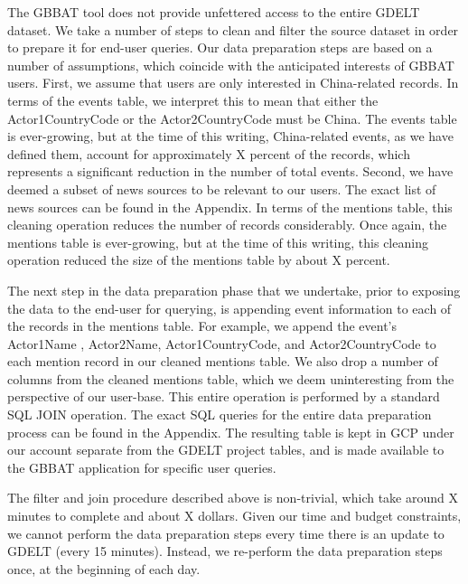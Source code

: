 \documentclass[preprint,authoryear,12pt]{elsarticle/elsarticle}
\begin{document}
The GBBAT tool does not provide unfettered access to the entire GDELT dataset. We take a number of steps to clean and filter the source dataset in order to prepare it for end-user queries. Our data preparation steps are based on a number of assumptions, which coincide with the anticipated interests of GBBAT users. First, we assume that users are only interested in China-related records. In terms of the events table, we interpret this to mean that either the Actor1CountryCode or the Actor2CountryCode must be China. The events table is ever-growing, but at the time of this writing, China-related events, as we have defined them, account for approximately X percent of the records, which represents a significant reduction in the number of total events. Second, we have deemed a subset of news sources to be relevant to our users. The exact list of news sources can be found in the Appendix. In terms of the mentions table, this cleaning operation reduces the number of records considerably. Once again, the mentions table is ever-growing, but at the time of this writing, this cleaning operation reduced the size of the mentions table by about X percent. 

The next step in the data preparation phase that we undertake, prior to exposing the data to the end-user for querying, is appending event information to each of the records in the mentions table. For example, we append the event's Actor1Name , Actor2Name, Actor1CountryCode, and Actor2CountryCode to each mention record in our cleaned mentions table. We also drop a number of columns from the cleaned mentions table, which we deem uninteresting from the perspective of our user-base. This entire operation is performed by a standard SQL JOIN operation. The exact SQL queries for the entire data preparation process can be found in the Appendix. The resulting table is kept in GCP under our account separate from the GDELT project tables, and is made available to the GBBAT application for specific user queries.

The filter and join procedure described above is non-trivial, which take around X minutes to complete and about X dollars. Given our time and budget constraints, we cannot perform the data preparation steps every time there is an update to GDELT (every 15 minutes). Instead, we re-perform the data preparation steps once, at the beginning of each day.
\end{document}
